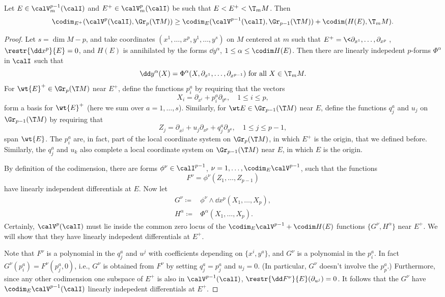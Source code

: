 \begin{lem}
    Let $E\in\calV^{p-1}_m(\calI)$ and $E^+\in \calV^p_m(\calI)$ be such that $E<E^+<\T_m M$. Then 
    \[\codim_{E^+}(\calV^p(\calI),\Gr_p(\T M))\geq \codim_E(\calV^{p-1}(\calI),\Gr_{p-1}(\T M))+\codim(H(E),\T_m M).\]
\end{lem}
\begin{proof}
    Let $s=\dim M-p$, and take coordinates $(x^1,\ldots,x^p,y^1,\ldots,y^s)$ on $M$ centered at $m$ such that $E^+=\<\partial_{x^1},\ldots,\partial_{x^p}\>$, $\restr{\dd x^p}{E}=0$, and $H(E)$ is annihilated by the forms $\dd y^\alpha$, $1\leq\alpha\leq \codim H(E)$. Then there are linearly indepedent $p$-forms $\Phi^\alpha$ in $\calI$ such that 
    \[\dd y^\alpha(X)=\Phi^\alpha(X,\partial_{x^1},\ldots,\partial_{x^{p-1}})\text{ for all }X\in\T_m M.\label{eq 8.4 Ivey}\]
    For $\wt{E}^+\in\Gr_p(\T M)$ near $E^+$, define the functions $p^a_i$ by requiring that the vectors 
    \[X_i=\partial_{x^i}+p^a_i\partial_{y^a},\quad 1\leq i\leq p,\]
    form a basis for $\wt{E}^+$ (here we sum over $a=1,\ldots,s$). Similarly, for $\wt E\in\Gr_{p-1}(\T M)$ near $E$, define the functions $q^a_j$ and $u_j$ on $\Gr_{p-1}(\T M)$ by requiring that 
    \[Z_j=\partial_{x^j}+u_j\partial_{x^p}+q^a_j\partial_{y^a},\quad 1\leq j\leq p-1,\]
    span $\wt{E}$. The $p^a_i$ are, in fact, part of the local coordinate system on $\Gr_p(\T M)$, in which $E^+$ is the origin, that we defined before. Similarly, the $q^a_j$ and $u_k$ also complete a local coordinate system on $\Gr_{p-1}(\T M)$ near $E$, in which $E$ is the origin.

    By definition of the codimension, there are forms $\phi^\nu\in\calI^{p-1}$, $\nu=1,\ldots,\codim_E\calV^{p-1}$, such that the functions 
    \[F^\nu=\phi^\nu(Z_1,\ldots,Z_{p-1})\]
    have linearly independent differentials at $E$. Now let 
    \begin{align}
        G^\nu\coloneqq &\phi^\nu\wedge\dd x^p(X_1,\ldots,X_p),\\
        H^\alpha\coloneqq &\Phi^\alpha(X_1,\ldots,X_p).
    \end{align}
    Certainly, $\calV^p(\calI)$ must lie inside the common zero locus of the $\codim_E\calV^{p-1}+\codim H(E)$ functions $\{G^\nu,H^\alpha\}$ near $E^+$. We will show that they have linearly indepedent differentials at $E^+$.

    Note that $F^\nu$ is a polynomial in the $q^a_j$ and $u^j$ with coefficients depending on $\{x^i,y^a\}$, and $G^\nu$ is a polynomial in the $p^a_i$. In fact $G^\nu(p^a_i)=F^\nu(p^a_j,0)$, i.e., $G^\nu$ is obtained from $F^\nu$ by setting $q^a_j=p^a_j$ and $u_j=0$. (In particular, $G^\nu$ doesn't involve the $p^a_p$.) Furthermore, since any other codimension one subspace of $E^+$ is also in $\calV^{p-1}(\calI)$, $\restr{\dd F^\nu}{E}(\partial_{u^j})=0$. It follows that the $G^\nu$ have $\codim_E \calV^{p-1}(\calI)$ linearly indepedent differentials at $E^+$.


\end{proof}
